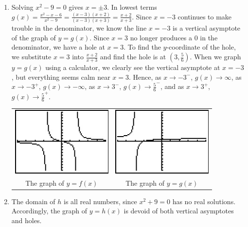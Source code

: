 \begin{ex}
\begin{enumerate}
\item  Solving $x^2 - 9 = 0$ gives $x = \pm 3$.  In lowest terms $g(x) = \frac{x^2-x-6}{x^2-9} = \frac{(x-3)(x+2)}{(x-3)(x+3)} = \frac{x+2}{x+3}$.  Since $x=-3$ continues to make trouble in the denominator, we know the line $x=-3$ is a vertical asymptote of the graph of $y=g(x)$.  Since $x=3$ no longer produces a $0$ in the denominator,  we have a hole at $x=3$.  To find the $y$-coordinate of the hole, we substitute $x=3$ into $\frac{x+2}{x+3}$ and find the hole is at $\left(3, \frac{5}{6}\right)$.  When we graph $y=g(x)$ using a calculator, we clearly see the vertical asymptote at $x=-3$, but everything seems calm near $x=3$.  Hence, as $x \rightarrow -3^{-}$, $g(x) \rightarrow \infty$, as $x \rightarrow -3^{+}$, $g(x) \rightarrow -\infty$, as $x \rightarrow 3^{-}$, $g(x) \rightarrow \frac{5}{6}^{-}$, and as $x \rightarrow 3^{+}$, $g(x) \rightarrow \frac{5}{6}^{+}$.

\begin{center}

\begin{tabular}{cc}

\includegraphics[width=2in]{./RationalsGraphics/Rationals02.jpg} \hspace{0.75in} & \includegraphics[width=2in]{./RationalsGraphics/Rationals03.jpg} \\

The graph of $y=f(x)$  \hspace{0.75in} & The graph of $y=g(x)$ \\


\end{tabular}
\end{center} 

\item  The domain of $h$ is all real numbers, since $x^2+9 = 0$ has no real solutions.  Accordingly, the graph of $y=h(x)$ is devoid of both vertical asymptotes and holes.


\end{enumerate}
\end{ex}
